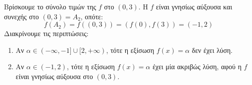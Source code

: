 \begin{alist}
    \item Βρίσκουμε το σύνολο τιμών της $f$ στο $(0,3)$. Η $f$ είναι γνησίως αύξουσα και συνεχής στο $(0,3) = A_2$, οπότε:
    \[
    f(A_2) = f((0,3)) = (f(0), f(3)) = (-1,2)
    \]
    Διακρίνουμε τις περιπτώσεις:
    \begin{enumerate}
        \item Αν $\alpha \in (-\infty, -1] \cup [2, +\infty)$, τότε η εξίσωση $f(x) = \alpha$ δεν έχει λύση.
        \item Αν $\alpha \in (-1,2)$, τότε η εξίσωση $f(x) = \alpha$ έχει μία ακριβώς λύση, αφού η $f$ είναι γνησίως αύξουσα στο $(0,3)$.
    \end{enumerate} 
\end{alist}